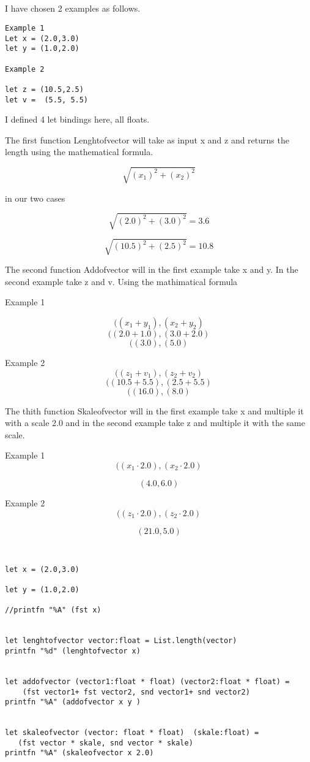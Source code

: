 \documentclass{article}
\begin{document}
\subsection{}

I have chosen 2 examples as follows.

    \begin{lstlisting}
Example 1
Let x = (2.0,3.0)
let y = (1.0,2.0)

Example 2

let z = (10.5,2.5)
let v =  (5.5, 5.5)

    \end{lstlisting}

I defined 4 let bindings here, all floats. 

The first function Lenghtofvector will take as input x and z and returns the length using the mathematical formula.

$$ \sqrt{(x_1)^2 + (x_2)^2}$$

in our two cases

$$ \sqrt{(2.0)^2 + (3.0)^2} = 3.6$$

$$ \sqrt{(10.5)^2 + (2.5)^2} = 10.8 $$

The second function Addofvector will in the first example take x and y. In the second example take z and v. Using the mathimatical formula 

Example 1

$$((x_1 + y_1),(x_2+y_2)$$
$$((2.0 + 1.0),(3.0+2.0)$$
$$((3.0),(5.0)$$

Example 2
$$((z_1 + v_1),(z_2+v_2)$$
$$((10.5+ 5.5),(2.5+5.5)$$
$$((16.0),(8.0)$$

The thith function Skaleofvector will in the first example take x and multiple it with a scale 2.0 and in the second example take z and multiple it with the same scale.

Example 1
$$((x_1 \cdot 2.0) ,(x_2 \cdot 2.0)$$

$$(4.0,6.0)$$

Example 2
$$((z_1 \cdot 2.0) ,(z_2 \cdot 2.0)$$

$$(21.0,5.0)$$




\subsection{}


    \begin{lstlisting}

let x = (2.0,3.0)

let y = (1.0,2.0)

//printfn "%A" (fst x)


let lenghtofvector vector:float = List.length(vector)
printfn "%d" (lenghtofvector x)


let addofvector (vector1:float * float) (vector2:float * float) = 
    (fst vector1+ fst vector2, snd vector1+ snd vector2)
printfn "%A" (addofvector x y )


let skaleofvector (vector: float * float)  (skale:float) = 
   (fst vector * skale, snd vector * skale)
printfn "%A" (skaleofvector x 2.0)
    \end{lstlisting}
\end{document}
